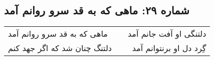 \begin{center}
\section*{شماره ۲۹: ماهی که به قد سرو روانم آمد}
\label{sec:029}
\begin{longtable}{l p{0.5cm} r}
ماهی که به قد سرو روانم آمد
&&
دلتنگی او آفت جانم آمد
\\
دلتنگ چنان شد که اگر جهد کنم
&&
گِرد دل او برنتوانم آمد
\\
\end{longtable}
\end{center}
